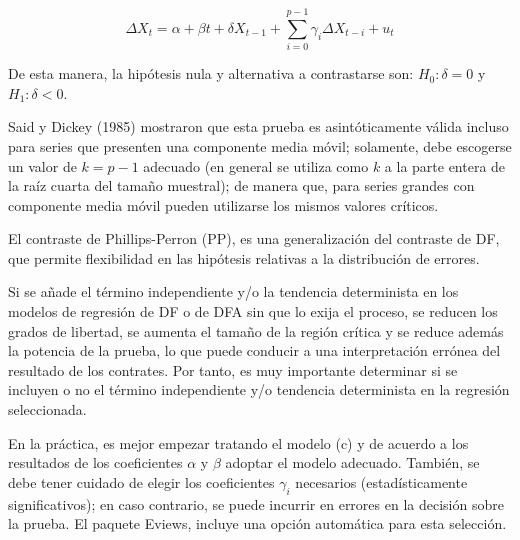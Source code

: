 \[
\Delta X_{t}=\alpha +\beta t+\delta X_{t-1}+\sum_{i=0}^{p-1} {\gamma 
_{i}\Delta X_{t-i}} +u_{t}
\]

De esta manera, la hip\'{o}tesis nula y alternativa a contrastarse son: $H_{0}:\delta =0$ y $H_{1}:\delta <0$.\newline

Said y Dickey (1985) mostraron que esta prueba es asint\'{o}ticamente v\'{a}lida incluso para series que presenten una componente media m\'{o}vil; solamente, debe escogerse un valor de $k=p-1$ adecuado (en general se utiliza como $k$ a la parte entera de la ra\'{i}z cuarta del tama\~{n}o muestral); de manera que, para series grandes con componente media m\'{o}vil pueden utilizarse los mismos valores cr\'{i}ticos.\newline

El contraste de Phillips-Perron (PP), es una generalizaci\'{o}n del contraste de DF, que permite flexibilidad en las hip\'{o}tesis relativas a la distribuci\'{o}n de errores.

\begin{observacion}
Si se a\~{n}ade el t\'{e}rmino independiente y/o la tendencia determinista en los modelos de regresi\'{o}n de DF o de DFA sin que lo exija el proceso, se reducen los grados de libertad, se aumenta el tama\~{n}o de la regi\'{o}n cr\'{i}tica y se reduce adem\'{a}s la potencia de la prueba, lo que puede conducir a una interpretaci\'{o}n err\'{o}nea del resultado de los contrates. Por tanto, es muy importante determinar si se incluyen o no el t\'{e}rmino independiente y/o tendencia determinista en la regresi\'{o}n seleccionada.\newline

En la pr\'{a}ctica, es mejor empezar tratando el modelo (c) y de acuerdo a los resultados de los coeficientes $\alpha$ y $\beta$ adoptar el modelo adecuado. Tambi\'{e}n, se debe tener cuidado de elegir los coeficientes $\gamma_{i}$ necesarios (estad\'{i}sticamente significativos); en caso contrario, se puede incurrir en errores en la decisi\'{o}n sobre la prueba. El paquete Eviews, incluye una opci\'{o}n autom\'{a}tica para esta selecci\'{o}n.
\end{observacion}


